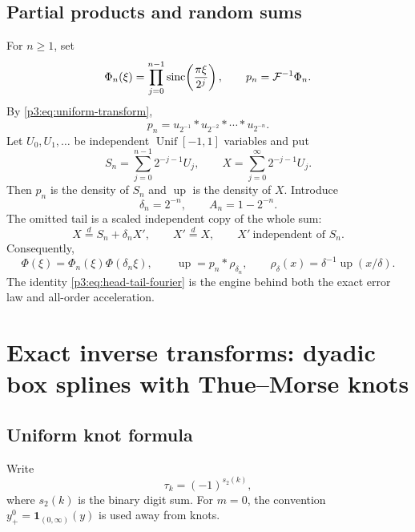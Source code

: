 \documentclass[11pt,oneside]{article}
\numberwithin{equation}{section}
\theoremstyle{definition}
\theoremstyle{remark}
\newcommand{\Up}{\operatorname{up}}
\newcommand{\sinc}{\operatorname{sinc}}
\begin{document}
\subsection{Partial products and random sums}

For $n\ge1$, set
\begin{equation}
 \Phi_n(\xi)=\prod_{j=0}^{n-1}\sinc\!\left(\frac{\pi\xi}{2^j}\right),
 \qquad p_n=\Fourier^{-1}\Phi_n.
 \label{p3:eq:prefix-product}
\end{equation}
By \cref{p3:eq:uniform-transform},
\begin{equation}
 p_n=u_{2^{-1}}*u_{2^{-2}}*\cdots*u_{2^{-n}}.
 \label{p3:eq:prefix-convolution}
\end{equation}
Let $U_0,U_1,\ldots$ be independent $\operatorname{Unif}[-1,1]$ variables and put
\begin{equation}
 S_n=\sum_{j=0}^{n-1}2^{-j-1}U_j,
 \qquad
 X=\sum_{j=0}^{\infty}2^{-j-1}U_j.
 \label{p3:eq:random-sums}
\end{equation}
Then $p_n$ is the density of $S_n$ and $\Up$ is the density of $X$.
Introduce
\begin{equation}
 \delta_n=2^{-n},\qquad A_n=1-2^{-n}.
 \label{p3:eq:delta-A}
\end{equation}
The omitted tail is a scaled independent copy of the whole sum:
\begin{equation}
 X\overset d=S_n+\delta_nX',
 \qquad X'\overset d=X,
 \qquad X'\ \text{independent of }S_n.
 \label{p3:eq:head-tail-random}
\end{equation}
Consequently,
\begin{equation}
 \Phi(\xi)=\Phi_n(\xi)\Phi(\delta_n\xi),
 \qquad
 \Up=p_n*\rho_{\delta_n},
 \qquad
 \rho_\delta(x)=\delta^{-1}\Up(x/\delta).
 \label{p3:eq:head-tail-fourier}
\end{equation}
The identity \cref{p3:eq:head-tail-fourier} is the engine behind both the exact error law
and all-order acceleration.

\section{Exact inverse transforms: dyadic box splines with Thue--Morse knots}
\label{p3:sec:exact-spline}

\subsection{Uniform knot formula}

Write
\begin{equation}
 \tau_k=(-1)^{s_2(k)},
 \label{p3:eq:tm-sign}
\end{equation}
where $s_2(k)$ is the binary digit sum.  For $m=0$, the convention
$y_+^0=\mathbf 1_{(0,\infty)}(y)$ is used away from knots.
\end{document}
